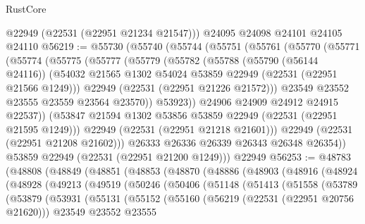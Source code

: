 \begin{lexlean}{RustCore}
\begin{coremodule}
      @22949
      (@22531 (@22951 @21234 @21547)))
    @24095
    @24098
    @24101
    @24105
    @24110
@56219 := @55730
    (@55740
      (@55744
        (@55751
          (@55761
            (@55770
              (@55771
                (@55774
                  (@55775
                    (@55777
                      (@55779
                        (@55782
                          (@55788
                            (@55790 (@56144 @24116))
                            (@54032
                              @21565
                              @1302
                              @54024
                              @53859
                              @22949
                              (@22531 (@22951 @21566 @1249)))
                            @22949
                            (@22531 (@22951 @21226 @21572)))
                          @23549
                          @23552
                          @23555
                          @23559
                          @23564
                          @23570))
                      @53923))
                  @24906
                  @24909
                  @24912
                  @24915
                  @22537))
              (@53847 @21594 @1302 @53856 @53859 @22949 (@22531 (@22951 @21595 @1249)))
              @22949
              (@22531 (@22951 @21218 @21601)))
            @22949
            (@22531 (@22951 @21208 @21602)))
          @26333
          @26336
          @26339
          @26343
          @26348
          @26354))
      @53859
      @22949
      (@22531 (@22951 @21200 @1249)))
    @22949
@56253 := @48783
    (@48808
      (@48849
        (@48851
          (@48853
            (@48870
              (@48886
                (@48903
                  (@48916
                    (@48924
                      (@48928
                        (@49213
                          (@49519
                            (@50246
                              (@50406
                                (@51148
                                  (@51413
                                    (@51558
                                      (@53789
                                        (@53879
                                          (@53931
                                            (@55131
                                              (@55152
                                                (@55160
                                                  (@56219 (@22531 (@22951 @20756 @21620)))
                                                  @23549
                                                  @23552
                                                  @23555

\end{coremodule}
\end{lexlean}
